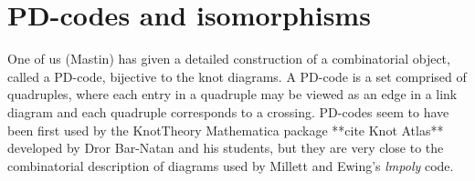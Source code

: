 \documentclass[amsmath,secnumarabic,floatfix,amssymb,nofootinbib,nobibnotes,letterpaper,11pt,tightenlines,showkeys]{revtex4}
\theoremstyle{definition}
\let\mgp=\marginpar \marginparwidth18mm \marginparsep1mm
\def\marginpar#1{\mgp{\raggedright\tiny #1}}
\let\lbl=\label
\def\label#1{\lbl{#1}\ifinner\else\marginpar{\ref{#1} #1}\ignorespaces\fi}
\begin{document}
\appendix
\section{PD-codes and isomorphisms}
\label{app:pdcodes}

One of us (Mastin) has given a detailed construction of a combinatorial object,  called a PD-code, bijective to the knot diagrams. A PD-code is a set comprised of quadruples, where each entry in a quadruple may be viewed as an edge in a link diagram and each quadruple corresponds to a crossing. PD-codes seem to have been first used by the KnotTheory Mathematica package **cite Knot Atlas** developed by Dror Bar-Natan and his students, but they are very close to the combinatorial description of diagrams used by Millett and Ewing's \emph{lmpoly} code\cite{MR98k:57010}.

\end{document}
